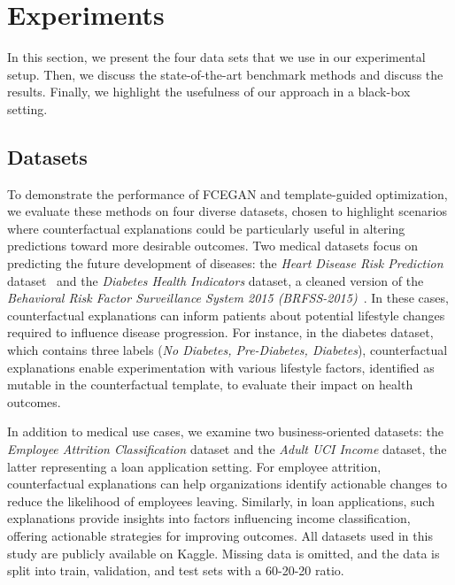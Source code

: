 \documentclass[runningheads]{llncs}
\begin{document}
\clearpage

\section{Experiments}
\label{sec:results}
In this section, we present the four data sets that we use in our experimental setup. Then, we discuss the state-of-the-art benchmark methods and discuss the results. Finally, we highlight the usefulness of our approach in a black-box setting.

\subsection{Datasets}
To demonstrate the performance of FCEGAN and template-guided optimization, we evaluate these methods on four diverse datasets, chosen to highlight scenarios where counterfactual explanations could be particularly useful in altering predictions toward more desirable outcomes. Two medical datasets focus on predicting the future development of diseases: the \textit{Heart Disease Risk Prediction} dataset~\cite{lupague2023integrated} and the \textit{Diabetes Health Indicators} dataset, a cleaned version of the \textit{Behavioral Risk Factor Surveillance System 2015 (BRFSS-2015)}~\cite{cdc2015brfss}. In these cases, counterfactual explanations can inform patients about potential lifestyle changes required to influence disease progression. For instance, in the diabetes dataset, which contains three labels (\textit{No Diabetes, Pre-Diabetes, Diabetes}), counterfactual explanations enable experimentation with various lifestyle factors, identified as mutable in the counterfactual template, to evaluate their impact on health outcomes. 

In addition to medical use cases, we examine two business-oriented datasets: the \textit{Employee Attrition Classification} dataset and the \textit{Adult UCI Income} dataset, the latter representing a loan application setting. For employee attrition, counterfactual explanations can help organizations identify actionable changes to reduce the likelihood of employees leaving. Similarly, in loan applications, such explanations provide insights into factors influencing income classification, offering actionable strategies for improving outcomes. All datasets used in this study are publicly available on Kaggle. Missing data is omitted, and the data is split into train, validation, and test sets with a 60-20-20 ratio.
\end{document}
